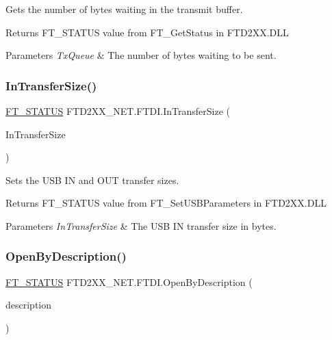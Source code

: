 Gets the number of bytes waiting in the transmit buffer. 

\begin{DoxyReturn}{Returns}
F\+T\+\_\+\+S\+T\+A\+T\+US value from F\+T\+\_\+\+Get\+Status in F\+T\+D2\+X\+X.\+D\+LL
\end{DoxyReturn}

\begin{DoxyParams}{Parameters}
{\em Tx\+Queue} & The number of bytes waiting to be sent.\\
\hline
\end{DoxyParams}
\mbox{\label{class_f_t_d2_x_x___n_e_t_1_1_f_t_d_i_a69f86e539ff65307def2cc227cc73154}} 
\subsubsection{\texorpdfstring{InTransferSize()}{InTransferSize()}}
{\footnotesize\ttfamily \mbox{\hyperlink{class_f_t_d2_x_x___n_e_t_1_1_f_t_d_i_aabe20ad905cc4ccc1e35dd5b877d9a83}{F\+T\+\_\+\+S\+T\+A\+T\+US}} F\+T\+D2\+X\+X\+\_\+\+N\+E\+T.\+F\+T\+D\+I.\+In\+Transfer\+Size (\begin{DoxyParamCaption}\item[{U\+Int32}]{In\+Transfer\+Size }\end{DoxyParamCaption})}



Sets the U\+SB IN and O\+UT transfer sizes. 

\begin{DoxyReturn}{Returns}
F\+T\+\_\+\+S\+T\+A\+T\+US value from F\+T\+\_\+\+Set\+U\+S\+B\+Parameters in F\+T\+D2\+X\+X.\+D\+LL
\end{DoxyReturn}

\begin{DoxyParams}{Parameters}
{\em In\+Transfer\+Size} & The U\+SB IN transfer size in bytes.\\
\hline
\end{DoxyParams}
\mbox{\label{class_f_t_d2_x_x___n_e_t_1_1_f_t_d_i_a72b3a7a790a74afa0611b5090fe46c08}} 
\subsubsection{\texorpdfstring{OpenByDescription()}{OpenByDescription()}}
{\footnotesize\ttfamily \mbox{\hyperlink{class_f_t_d2_x_x___n_e_t_1_1_f_t_d_i_aabe20ad905cc4ccc1e35dd5b877d9a83}{F\+T\+\_\+\+S\+T\+A\+T\+US}} F\+T\+D2\+X\+X\+\_\+\+N\+E\+T.\+F\+T\+D\+I.\+Open\+By\+Description (\begin{DoxyParamCaption}\item[{string}]{description }\end{DoxyParamCaption})}



